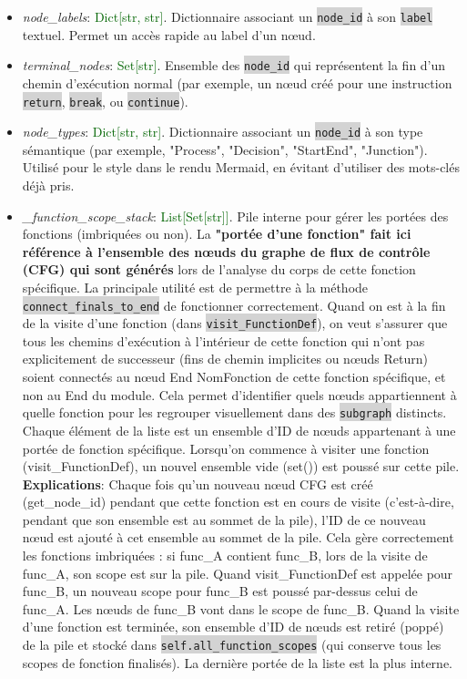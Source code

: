 \documentclass[11pt,a4paper]{article}
\newcommand{\code}[1]{\colorbox{lightgray}{\texttt{\small #1}}}
\newcommand{\var}[1]{\textit{#1}}
\newcommand{\vartype}[1]{\textcolor{darkgreen}{#1}}
\begin{document}
\begin{description}
\begin{itemize}
        \item \var{node\_labels}: \vartype{Dict[str, str]}. Dictionnaire associant un \code{node\_id} à son \code{label} textuel. Permet un accès rapide au label d'un nœud.
        
        \item \var{terminal\_nodes}: \vartype{Set[str]}. Ensemble des \code{node\_id} qui représentent la fin d'un chemin d'exécution normal (par exemple, un nœud créé pour une instruction \code{return}, \code{break}, ou \code{continue}).
        
        \item \var{node\_types}: \vartype{Dict[str, str]}. Dictionnaire associant un \code{node\_id} à son type sémantique (par exemple, "Process", "Decision", "StartEnd", "Junction"). Utilisé pour le style dans le rendu Mermaid, en évitant d'utiliser des mots-clés déjà pris.
        
        \item \var{\_function\_scope\_stack}: \vartype{List[Set[str]]}. Pile interne pour gérer les portées des fonctions (imbriquées ou non). La \textbf{"portée d'une fonction" fait ici référence à l'ensemble des nœuds du graphe de flux de contrôle (CFG) qui sont générés} lors de l'analyse du corps de cette fonction spécifique. La principale utilité est de permettre à la méthode \code{connect\_finals\_to\_end} de fonctionner correctement. Quand on est à la fin de la visite d'une fonction (dans \code{visit\_FunctionDef}), on veut s'assurer que tous les chemins d'exécution à l'intérieur de cette fonction qui n'ont pas explicitement de successeur (fins de chemin implicites ou nœuds Return) soient connectés au nœud End {NomFonction} de cette fonction spécifique, et non au End du module. Cela permet d'identifier quels nœuds appartiennent à quelle fonction pour les regrouper visuellement dans des \code{subgraph} distincts. Chaque élément de la liste est un ensemble d'ID de nœuds appartenant à une portée de fonction spécifique. Lorsqu'on commence à visiter une fonction (visit\_FunctionDef), un nouvel ensemble vide (set()) est poussé sur cette pile. \textbf{Explications}: Chaque fois qu'un nouveau nœud CFG est créé (get\_node\_id) pendant que cette fonction est en cours de visite (c'est-à-dire, pendant que son ensemble est au sommet de la pile), l'ID de ce nouveau nœud est ajouté à cet ensemble au sommet de la pile. Cela gère correctement les fonctions imbriquées : si func\_A contient func\_B, lors de la visite de func\_A, son scope est sur la pile. Quand visit\_FunctionDef est appelée pour func\_B, un nouveau scope pour func\_B est poussé par-dessus celui de func\_A. Les nœuds de func\_B vont dans le scope de func\_B. Quand la visite d'une fonction est terminée, son ensemble d'ID de nœuds est retiré (poppé) de la pile et stocké dans \code{self.all\_function\_scopes} (qui conserve tous les scopes de fonction finalisés). La dernière portée de la liste est la plus interne.
        

\end{itemize}
\end{description}
\end{document}
